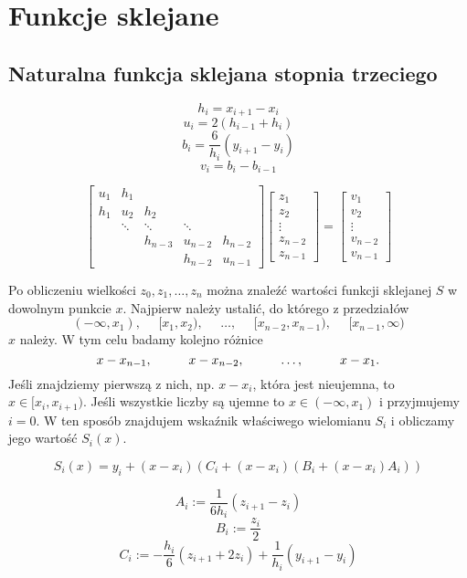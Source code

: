 \documentclass[../mn-notatki.tex]{subfiles}
\begin{document}
\section{Funkcje sklejane}

\subsection{Naturalna funkcja sklejana stopnia trzeciego}
\begin{tcolorbox}
\[
h_i = x_{i+1} - x_i
\]
\[
u_i = 2(h_{i-1} + h_i)
\]
\[
b_i = \frac{6}{h_i}(y_{i+1}-y_i)
\]
\[
v_i = b_i - b_{i-1}
\]
\end{tcolorbox}

\begin{tcolorbox}
\[
\begin{bmatrix}
u_1 & h_1    &         &         &\\
h_1 & u_2    & h_2     &         &\\
    & \ddots & \ddots  & \ddots  &\\
    &        & h_{n-3} & u_{n-2} & h_{n-2} \\
    &        &         & h_{n-2} & u_{n-1}
\end{bmatrix}
\begin{bmatrix}
z_1 \\
z_2 \\
\vdots \\
z_{n-2}\\
z_{n-1}
\end{bmatrix}
=
\begin{bmatrix}
v_1 \\
v_2 \\
\vdots \\
v_{n-2}\\
v_{n-1}
\end{bmatrix}
\]
\end{tcolorbox}

Po obliczeniu wielkości $z_0, z_1, \ldots, z_n$ można znaleźć wartości funkcji
sklejanej $S$ w dowolnym punkcie $x$. Najpierw należy ustalić, do którego
z przedziałów
\begin{equation*}
(-\infty, x_1),
~~~~~~ [ x_1, x_2),
~~~~~~ \ldots,
~~~~~~ [x_{n-2}, x_{n-1}),
~~~~~~ [x_{n-1}, \infty)
\end{equation*}
$x$ należy. W tym celu badamy kolejno różnice
\[
x - x_{n-1}, \hspace*{1cm} x - x_{n-2}, \hspace*{1cm} \ldots, \hspace*{1cm} x-x_1.
\]
Jeśli znajdziemy pierwszą z nich, np. $x - x_i$, która jest nieujemna, to
$x \in [x_i, x_{i+1})$. Jeśli wszystkie liczby są ujemne to $x \in (-\infty, x_1)$
i przyjmujemy $i = 0$. W ten sposób znajdujem wskaźnik właściwego wielomianu
$S_i$ i obliczamy jego wartość $S_i(x)$.

\begin{tcolorbox}
\[
S_i(x) = y_i + (x-x_i)\left(  C_i + (x-x_i) (B_i + (x-x_i) A_i ) \right)
\]
\end{tcolorbox}
\begin{tcolorbox}
\[
A_i := \frac{1}{6h_i}(z_{i+1}-z_i)
\]
\[
B_i := \frac{z_i}{2}
\]
\[
C_i := -\frac{h_i}{6}(z_{i+1} + 2z_i) + \frac{1}{h_i} (y_{i+1} - y_i)
\]
\end{tcolorbox}


\pagebreak
\end{document}
